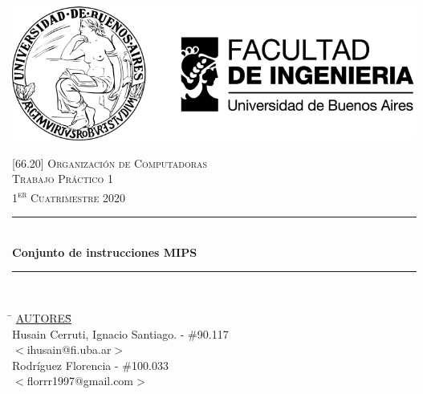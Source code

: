 \documentclass[a4paper,12pt]{article}
\numberwithin{equation}{section}
\numberwithin{figure}{section}
\begin{document}
\pagestyle{fancy}
\begin{titlepage}
	\newcommand{\HRule}{\rule{\linewidth}{0.5mm}} %
	\center %
	
	\thispagestyle{empty}
	\begin{center}
		\includegraphics[scale=1]{includes/banner_fiuba.pdf}\\
	\end{center}
	
	
	\textsc{\LARGE \textsc{[66.20] Organización de Computadoras}}\\[0.5cm]
	\textsc{\Large \textsc{Trabajo Práctico 1}}\\[0.5cm]
	\textsc{\large 1\textsuperscript{er} Cuatrimestre 2020}\\[0.25cm]
	
	\HRule\\[0.5cm]
	{\huge\bfseries Conjunto de instrucciones MIPS}\\[0.2cm]
	\HRule\\[0.5cm]
	
	\begin{tabbing}
		\hspace{2cm}\=\+
		\underline{AUTORES}\hspace{-1cm}\=\+\hspace{1cm}\=\hspace{6cm}\=\\[0.2cm]
		
		Husain Cerruti, Ignacio Santiago.	\>\>- \#90.117\\
		\>\footnotesize{$<$ihusain@fi.uba.ar$>$}\\
		
		Rodríguez Florencia	\>\>- \#100.033\\
		\>\footnotesize{$<$florrr1997@gmail.com$>$}\\
		

\end{tabbing}
\end{titlepage}
\end{document}
